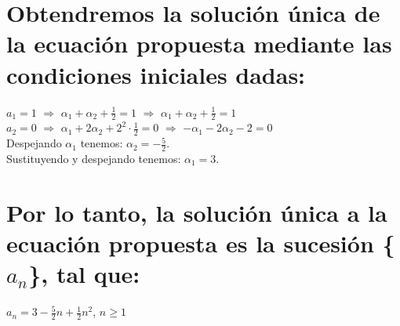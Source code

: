 \documentclass[12pt,letterpaper]{article}
\begin{document}
\section{Obtendremos la solución única de la ecuación propuesta mediante las condiciones iniciales dadas:}
\noindent
$a_1=1$ $\Rightarrow$ $\alpha_1+\alpha_2+\frac{1}{2}=1$ $\Longrightarrow$ $\alpha_1+\alpha_2+\frac{1}{2}=1$\\
$a_2=0$ $\Rightarrow$ $\alpha_1+2\alpha_2+2^2\cdot \frac{1}{2}=0$ $\Rightarrow$ $-\alpha_1-2\alpha_2-2=0$\\
Despejando $\alpha_1$ tenemos: $\alpha_2=-\frac{5}{2}$.\\
Sustituyendo y despejando tenemos: $\alpha_1=3$.

\section{Por lo tanto, la solución única a la ecuación propuesta es la sucesión \{$a_n$\}, tal que:}
\begin{center}
	$a_n=3-\frac{5}{2}n+\frac{1}{2}n^2$, $n\geq1$
\end{center}
\end{document}
